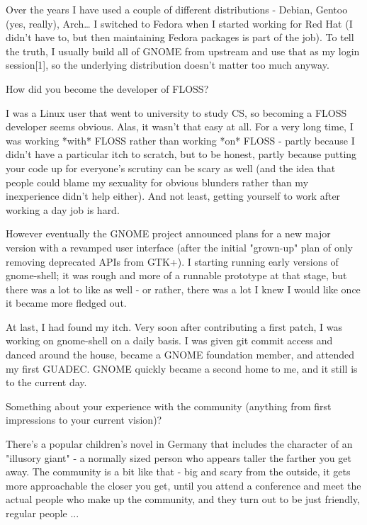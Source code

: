 \documentclass[10pt, a5paper]{article}
\begin{document}
\begin{Parallel}[p]{}{}
{Over the years I have used a couple of different distributions - Debian, Gentoo (yes, really), Arch… I switched to Fedora when I started working for Red Hat (I didn't have to, but then maintaining Fedora packages is part of the job). To tell the truth, I usually build all of GNOME from upstream and use that as my login session[1], so the underlying distribution doesn't matter too much anyway.




\q How did you become the developer of FLOSS?

\a I was a Linux user that went to university to study CS, so becoming a FLOSS developer seems obvious. Alas, it wasn't that easy at all. For a very long time, I was working *with* FLOSS rather than working *on* FLOSS - partly because I didn't have a particular itch to scratch, but to be honest, partly because putting your code up for everyone's scrutiny can be scary as well (and the idea that people could blame my sexuality for obvious blunders rather than my inexperience didn't help either). And not least, getting yourself to work after working a day job is hard.

However eventually the GNOME project announced plans for a new major version with a revamped user interface (after the initial "grown-up" plan of only removing deprecated APIs from GTK+). I starting running early versions of gnome-shell; it was rough and more of a runnable prototype at that stage, but there was a lot to like as well - or rather, there was a lot I knew I would like once it became more fledged out.

At last, I had found my itch. Very soon after contributing a first patch, I was working on gnome-shell on a daily basis. I was given git commit access and danced around the house, became a GNOME foundation member, and attended my first GUADEC. GNOME quickly became a second home to me, and it still is to the current day.


\q Something about your experience with the community (anything from first
impressions to your current vision)?

\a There's a popular children's novel in Germany that includes the character of an "illusory giant" - a normally sized person who appears taller the farther you get away. The community is a bit like that - big and scary from the outside, it gets more approachable the closer you get, until you attend a conference and meet the actual people who make up the community, and they turn out to be just friendly, regular people ...

}
\end{Parallel}
\end{document}

